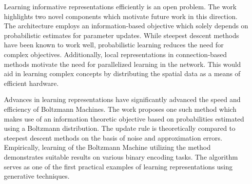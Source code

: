 \documentclass[11pt,letterpaper]{article}
\begin{document}
Learning informative representations efficiently is an open problem. The work highlights two novel components which motivate future work in this direction. The architecture employs an information-based objective which solely depends on probabilistic estimates for parameter updates. While steepest descent methods have been known to work well, probabilistic learning reduces the need for complex objectives. Additionally, local representations in connection-based methods motivate the need for parallelized learning in the network. This would aid in learning complex concepts by distributing the spatial data as a means of efficient hardware. 

Advances in learning representations have significantly advanced the speed and efficiency of Boltzmann Machines. The work proposes one such method which makes use of an information theoretic objective based on probabilities estimated using a Boltzmann distribution. The update rule is theoretically compared to steepest descent methods on the basis of noise and approximation errors. Empirically, learning of the Boltzmann Machine utilizing the method demonstrates suitable results on various binary encoding tasks. The algorithm serves as one of the first practical examples of learning representations using generative techniques.  
\end{document}
